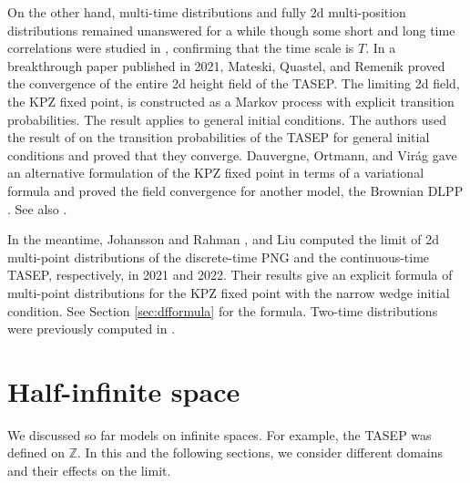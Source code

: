 \documentclass[10pt]{article}
\theoremstyle{plain}
\theoremstyle{definition}
\newcommand{\Z}{\mathbb{Z}}
\numberwithin{equation}{section}
\begin{document}
On the other hand, multi-time distributions and fully 2d multi-position distributions remained unanswered for a while
though some short and long time correlations were studied in \cite{Ferrari-Spohn16}, confirming that the time scale is $T$.    
In a breakthrough paper \cite{Matetski-Quastel-Remenik17} published in 2021, Mateski, Quastel, and Remenik proved the convergence of the entire 2d height field of the TASEP. 
The limiting 2d field, the KPZ fixed point, is constructed as a Markov process with explicit transition probabilities. 
The result applies to general initial conditions. 
The authors used the result of \cite{Sasamoto05, Borodin-Ferrari-Prahofer-Sasamoto07} on the transition probabilities of the TASEP for general initial conditions and proved that they converge. 
Dauvergne, Ortmann, and Vir\'ag gave an alternative formulation of the KPZ fixed point in terms of a variational formula and proved the field convergence for another model, the Brownian DLPP \cite{Dauvergne-Ortmann-Virag18}.  
See also \cite{Virag20}. 


In the meantime, Johansson and Rahman \cite{Johansson-Rahman19}, and Liu \cite{Liu19} computed the limit of 2d multi-point distributions of the discrete-time PNG and the continuous-time TASEP, respectively, in 2021 and 2022. 
Their results give an explicit formula of multi-point distributions for the KPZ fixed point with the narrow wedge initial condition.  
See Section \ref{sec:dfformula} for the formula. 
Two-time distributions were previously computed in  \cite{Johansson17, Johansson19}. 



\section{Half-infinite space} \label{sec:half}

We discussed so far models on infinite spaces. 
For example, the TASEP was defined on $\Z$. 
In this and the following sections, we consider different domains and their effects on the limit. 
\end{document}
